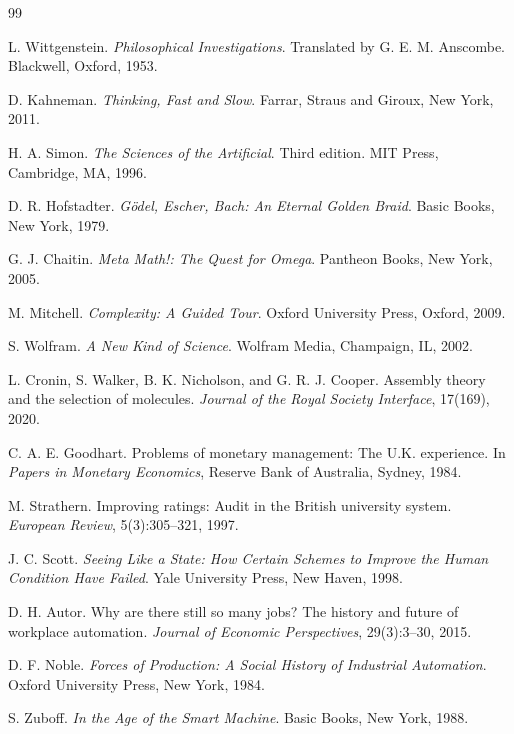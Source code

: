 \documentclass[12pt]{article}
\begin{document}
\newpage
\begin{thebibliography}{99}

L. Wittgenstein.
\textit{Philosophical Investigations}.
Translated by G. E. M. Anscombe.
Blackwell, Oxford, 1953.

D. Kahneman.
\textit{Thinking, Fast and Slow}.
Farrar, Straus and Giroux, New York, 2011.

H. A. Simon.
\textit{The Sciences of the Artificial}.
Third edition.
MIT Press, Cambridge, MA, 1996.

D. R. Hofstadter.
\textit{Gödel, Escher, Bach: An Eternal Golden Braid}.
Basic Books, New York, 1979.

G. J. Chaitin.
\textit{Meta Math!: The Quest for Omega}.
Pantheon Books, New York, 2005.

M. Mitchell.
\textit{Complexity: A Guided Tour}.
Oxford University Press, Oxford, 2009.

S. Wolfram.
\textit{A New Kind of Science}.
Wolfram Media, Champaign, IL, 2002.

L. Cronin, S. Walker, B. K. Nicholson, and G. R. J. Cooper.
Assembly theory and the selection of molecules.
\textit{Journal of the Royal Society Interface}, 17(169), 2020.

C. A. E. Goodhart.
Problems of monetary management: The U.K. experience.
In \textit{Papers in Monetary Economics}, Reserve Bank of Australia, Sydney, 1984.

M. Strathern.
Improving ratings: Audit in the British university system.
\textit{European Review}, 5(3):305--321, 1997.

J. C. Scott.
\textit{Seeing Like a State: How Certain Schemes to Improve the Human Condition Have Failed}.
Yale University Press, New Haven, 1998.

D. H. Autor.
Why are there still so many jobs? The history and future of workplace automation.
\textit{Journal of Economic Perspectives}, 29(3):3--30, 2015.

D. F. Noble.
\textit{Forces of Production: A Social History of Industrial Automation}.
Oxford University Press, New York, 1984.

S. Zuboff.
\textit{In the Age of the Smart Machine}.
Basic Books, New York, 1988.


\end{thebibliography}
\end{document}
